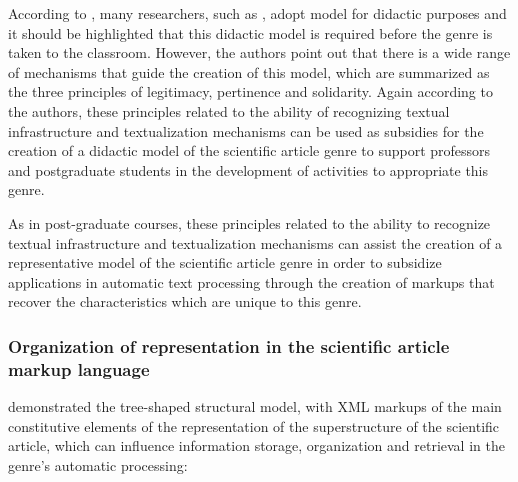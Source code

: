 \documentclass[english]{textolivre}
\begin{document}
According to \textcite{silva_elaboracao_2014}, many researchers, such as \textcite{schneuwly_generos_2004}, adopt \textcite{bronckart_atividade_1999} model for didactic purposes and it should be highlighted that this didactic model is required before the genre is taken to the classroom. However, the authors point out that there is a wide range of mechanisms that guide the creation of this model, which are summarized as the three principles of legitimacy, pertinence and solidarity. Again according to the authors, these principles related to the ability of recognizing textual infrastructure and textualization mechanisms can be used as subsidies for the creation of a didactic model of the scientific article genre to support professors and postgraduate students in the development of activities to appropriate this genre.

As in post-graduate courses, these principles related to the ability to recognize textual infrastructure and textualization mechanisms can assist the creation of a representative model of the scientific article genre in order to subsidize applications in automatic text processing through the creation of markups that recover the characteristics which are unique to this genre.

\subsubsection{Organization of representation in the scientific article markup language}\label{sec-organizacao-latex}
 demonstrated the tree-shaped structural model, with XML markups of the main constitutive elements of the representation of the superstructure of the scientific article, which can influence information storage, organization and retrieval in the genre’s automatic processing:  
\end{document}
